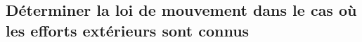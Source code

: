 \subsection{Déterminer la loi de mouvement dans le cas où les efforts extérieurs sont connus}
\renewcommand{\repExo}{../../ExercicesCompetences/C2_MettreEnOeuvreDemarche/C2_09_DeterminerLoiMouvement}

\renewcommand{\td}{01_T}
\graphicspath{{\repStyle/png/}{\repExo/\td/images/}}


\renewcommand{\td}{02_R}
\graphicspath{{\repStyle/png/}{\repExo/\td/images/}}


\renewcommand{\td}{03_TT}
\graphicspath{{\repStyle/png/}{\repExo/\td/images/}}


\renewcommand{\td}{04_RR}
\graphicspath{{\repStyle/png/}{\repExo/\td/images/}}


\renewcommand{\td}{05_RT}
\graphicspath{{\repStyle/png/}{\repExo/\td/images/}}


\renewcommand{\td}{06_TR}
\graphicspath{{\repStyle/png/}{\repExo/\td/images/}}


\renewcommand{\td}{07_RR3D}
\graphicspath{{\repStyle/png/}{\repExo/\td/images/}}


\renewcommand{\td}{08_RR3D}
\graphicspath{{\repStyle/png/}{\repExo/\td/images/}}


\renewcommand{\td}{09_RT_RSG}
\graphicspath{{\repStyle/png/}{\repExo/\td/images/}}

